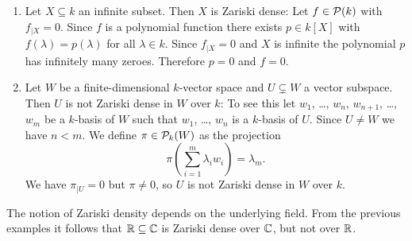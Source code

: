\begin{expls}
 \begin{enumerate}[label=\emph{\alph*)},leftmargin=*]
  \item 
   Let $X \subseteq k$ an infinite subset. Then $X$ is Zariski dense: Let $f \in \mathcal{P}(k)$ with $f_{|X} = 0$. Since $f$ is a polynomial function there exists $p \in k[X]$ with $f(\lambda) = p(\lambda)$ for all $\lambda \in k$. Since $f_{|X} = 0$ and $X$ is infinite the polynomial $p$ has infinitely many zeroes. Therefore $p = 0$ and $f = 0$.
  \item
   Let $W$ be a finite-dimensional $k$-vector space and $U \subsetneq W$ a vector subspace. Then $U$ is not Zariski dense in $W$ over $k$: To see this let $w_1$, \dots, $w_n$, $w_{n+1}$, \dots, $w_m$ be a $k$-basis of $W$ such that $w_1$, \dots, $w_n$ is a $k$-basis of $U$. Since $U \neq W$ we have $n < m$. We define $\pi \in \mathcal{P}_k(W)$ as the projection
   \[
    \pi\left(\sum_{i=1}^m \lambda_i w_i\right) = \lambda_m.
   \]
   We have $\pi_{|U} = 0$ but $\pi \neq 0$, so $U$ is not Zariski dense in $W$ over $k$.
 \end{enumerate}
\end{expls}


\begin{warn}
 The notion of Zariski density depends on the underlying field. From the previous examples it follows that $\mathbb{R} \subseteq \mathbb{C}$ is Zariski dense over $\mathbb{C}$, but not over $\mathbb{R}$.
\end{warn}



